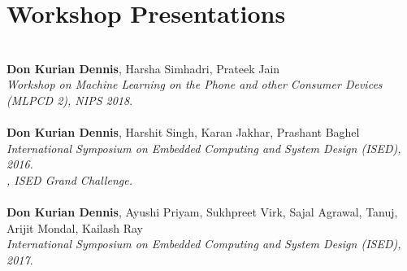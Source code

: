 \section{Workshop Presentations}
\\
\textbf{Don Kurian Dennis}, Harsha Simhadri, Prateek Jain\\
\textit{Workshop on Machine Learning on the Phone and other Consumer Devices (MLPCD 2), NIPS 2018}.\\[8px]
 \\
\textbf{Don Kurian Dennis}, Harshit Singh, Karan Jakhar, Prashant Baghel\\
\textit{International Symposium on Embedded Computing and System Design (ISED), 2016.}\\
\textit{, ISED Grand Challenge.}\\[8px]
\\
\textbf{Don Kurian Dennis}, Ayushi Priyam, Sukhpreet Virk, Sajal Agrawal, Tanuj, Arijit Mondal, Kailash Ray\\
\textit{International Symposium on Embedded Computing and System Design (ISED), 2017}.\\
